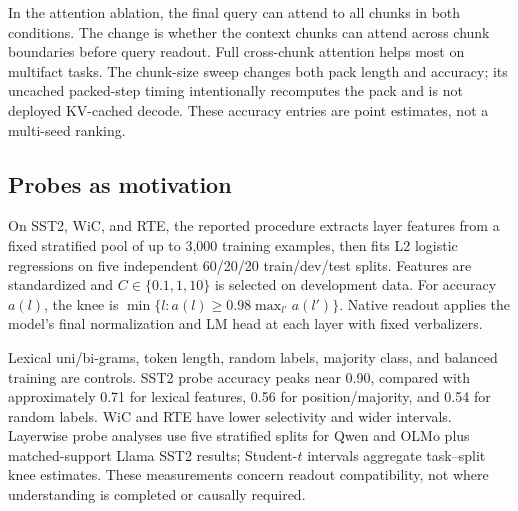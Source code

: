 In the attention ablation, the final query can attend to all chunks in both conditions. The change is whether the context chunks can attend across chunk boundaries before query readout. Full cross-chunk attention helps most on multifact tasks. The chunk-size sweep changes both pack length and accuracy; its uncached packed-step timing intentionally recomputes the pack and is not deployed KV-cached decode. These accuracy entries are point estimates, not a multi-seed ranking.

\subsection{Probes as motivation}
\label{app:semantic-probes}
On SST2, WiC, and RTE, the reported procedure extracts layer features from a fixed stratified pool of up to 3,000 training examples, then fits L2 logistic regressions on five independent 60/20/20 train/dev/test splits. Features are standardized and $C\in\{0.1,1,10\}$ is selected on development data. For accuracy $a(l)$, the knee is $\min\{l:a(l)\geq0.98\max_{l'}a(l')\}$. Native readout applies the model's final normalization and LM head at each layer with fixed verbalizers.

Lexical uni/bi-grams, token length, random labels, majority class, and balanced training are controls. SST2 probe accuracy peaks near 0.90, compared with approximately 0.71 for lexical features, 0.56 for position/majority, and 0.54 for random labels. WiC and RTE have lower selectivity and wider intervals. Layerwise probe analyses use five stratified splits for Qwen and OLMo plus matched-support Llama SST2 results; Student-$t$ intervals aggregate task--split knee estimates. These measurements concern readout compatibility, not where understanding is completed or causally required.
